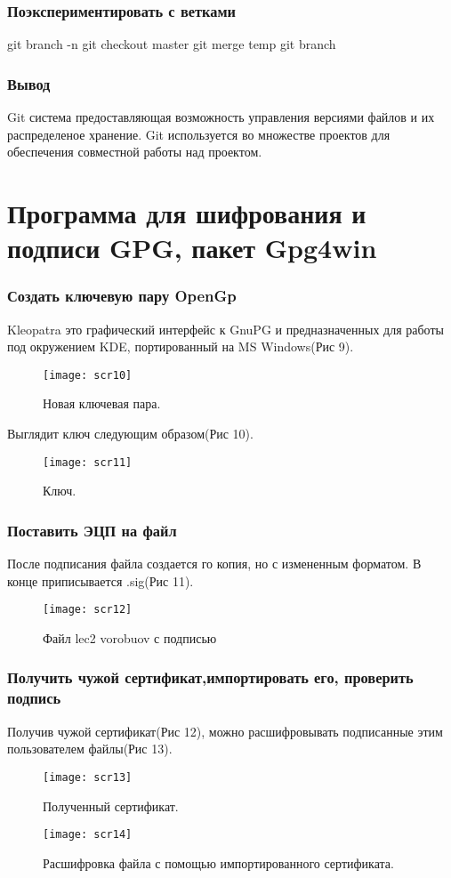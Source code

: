 \documentclass{article}
\begin{document}
\section[9]{Поэкспериментировать с ветками}

\begin{verbatim*}
git branch -n
git checkout master
git merge temp
git branch
\end{verbatim*}

\section[10]{Вывод}
Git система предоставляющая возможность управления версиями файлов и  их распределеное хранение. Git используется во множестве проектов для обеспечения совместной работы над проектом. 

\part[3]{Программа для шифрования и подписи GPG, пакет Gpg4win}

\section[1]{Создать ключевую пару OpenGp}

Kleopatra это графический интерфейс к GnuPG и предназначенных для работы под окружением KDE, портированный на MS Windows(Рис 9).
\begin{figure}
	\center
	\texttt{[image: scr10]}
	\caption{Новая ключевая пара.}
\end{figure}
Выглядит ключ следующим образом(Рис 10).
\begin{figure}
	\center
	\texttt{[image: scr11]}
	\caption{Ключ.}
\end{figure}

\section[2]{Поставить ЭЦП на файл}
После подписания файла создается го копия, но с измененным форматом. В конце приписывается .sig(Рис 11).
\begin{figure}
	\center
	\texttt{[image: scr12]}
	\caption{Файл lec2 vorobuov с подписью}
\end{figure}

\section[3]{Получить чужой сертификат,импортировать его, проверить подпись}
Получив чужой сертификат(Рис 12), можно расшифровывать подписанные этим пользователем файлы(Рис 13).
\begin{figure}
	\center
	\texttt{[image: scr13]}
	\caption{Полученный сертификат.}
\end{figure}
\begin{figure}
	\center
	\texttt{[image: scr14]}
	\caption{Расшифровка файла с помощью импортированного сертификата.}
\end{figure}
\end{document}

